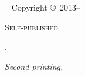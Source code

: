\newpage
\begin{fullwidth}
~\vfill
\thispagestyle{empty}
\setlength{\parindent}{0pt}
\setlength{\parskip}{\baselineskip}
Copyright \copyright\ 2013--\the\year\ \thanklessauthor

\par\textsc{Self-published}

\par\bookurl

\par \TODO.

\par\textit{Second printing, \monthyear}
\end{fullwidth}
